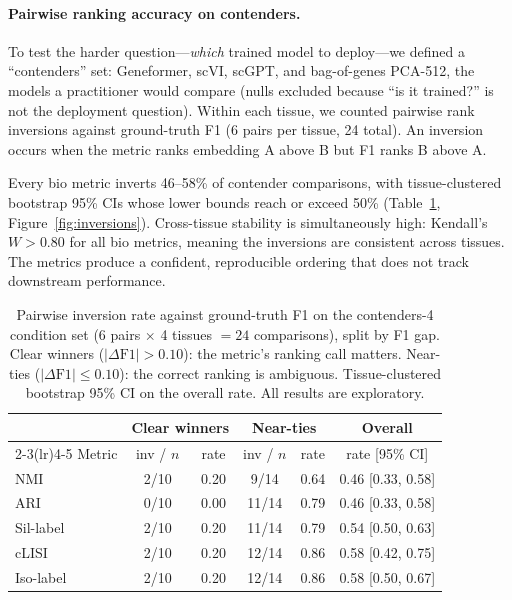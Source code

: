 \documentclass[10pt,letterpaper]{article}
\begin{document}
\paragraph{Pairwise ranking accuracy on contenders.} To test the harder question---\emph{which} trained model to deploy---we defined a ``contenders'' set: Geneformer, scVI, scGPT, and bag-of-genes PCA-512, the models a practitioner would compare (nulls excluded because ``is it trained?'' is not the deployment question). Within each tissue, we counted pairwise rank inversions against ground-truth F1 (6 pairs per tissue, 24 total). An inversion occurs when the metric ranks embedding A above B but F1 ranks B above A.

Every bio metric inverts 46--58\% of contender comparisons, with tissue-clustered bootstrap 95\% CIs whose lower bounds reach or exceed 50\% (Table~\ref{tab:scib_inversions}, Figure~\ref{fig:inversions}). Cross-tissue stability is simultaneously high: Kendall's $W > 0.80$ for all bio metrics, meaning the inversions are consistent across tissues. The metrics produce a confident, reproducible ordering that does not track downstream performance.

\begin{table}[t]
\centering
\caption{Pairwise inversion rate against ground-truth F1 on the contenders-4 condition set (6 pairs $\times$ 4 tissues $= 24$ comparisons), split by F1 gap. Clear winners ($|\Delta\text{F1}| > 0.10$): the metric's ranking call matters. Near-ties ($|\Delta\text{F1}| \leq 0.10$): the correct ranking is ambiguous. Tissue-clustered bootstrap 95\% CI on the overall rate. All results are exploratory.}
\label{tab:scib_inversions}
\small
\begin{tabular}{@{}lccccc@{}}
\toprule
 & \multicolumn{2}{c}{Clear winners} & \multicolumn{2}{c}{Near-ties} & Overall \\
\cmidrule(lr){2-3}\cmidrule(lr){4-5}
Metric & inv / $n$ & rate & inv / $n$ & rate & rate [95\% CI] \\
\midrule
NMI       & 2/10 & 0.20 & 9/14  & 0.64 & 0.46 [0.33, 0.58] \\
ARI       & 0/10 & 0.00 & 11/14 & 0.79 & 0.46 [0.33, 0.58] \\
Sil-label & 2/10 & 0.20 & 11/14 & 0.79 & 0.54 [0.50, 0.63] \\
cLISI     & 2/10 & 0.20 & 12/14 & 0.86 & 0.58 [0.42, 0.75] \\
Iso-label & 2/10 & 0.20 & 12/14 & 0.86 & 0.58 [0.50, 0.67] \\
\bottomrule
\end{tabular}
\end{table}
\end{document}
